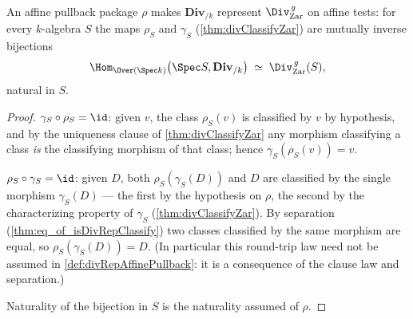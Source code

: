 \begin{theorem}
  \label{thm:divRepAffinePullback_equiv}
  \leanok
  An affine pullback package \(\rho\) makes \(\mathbf{Div}_{/k}\) represent
  \(\Div^{\,g}_{\mathrm{Zar}}\) on affine tests: for every \(k\)-algebra \(S\) the maps
  \(\rho_S\) and \(\gamma_S\) (\ref{thm:divClassifyZar}) are mutually inverse bijections
  \[
    \Hom_{\Over(\Spec k)}\bigl(\Spec S, \mathbf{Div}_{/k}\bigr)
      \;\simeq\; \Div^{\,g}_{\mathrm{Zar}}(S),
  \]
  natural in \(S\).
\end{theorem}
\begin{proof}
  \leanok
  \(\gamma_S \circ \rho_S = \id\): given \(v\), the class \(\rho_S(v)\) is classified by
  \(v\) by hypothesis, and by the uniqueness clause of \ref{thm:divClassifyZar} any
  morphism classifying a class \emph{is} the classifying morphism of that class; hence
  \(\gamma_S(\rho_S(v)) = v\).

  \(\rho_S \circ \gamma_S = \id\): given \(D\), both \(\rho_S(\gamma_S(D))\) and \(D\) are
  classified by the single morphism \(\gamma_S(D)\) --- the first by the hypothesis on
  \(\rho\), the second by the characterizing property of \(\gamma_S\)
  (\ref{thm:divClassifyZar}). By separation (\ref{thm:eq_of_isDivRepClassify}) two classes
  classified by the same morphism are equal, so \(\rho_S(\gamma_S(D)) = D\). (In particular
  this round-trip law need not be assumed in \ref{def:divRepAffinePullback}: it is a
  consequence of the clause law and separation.)

  Naturality of the bijection in \(S\) is the naturality assumed of \(\rho\).
\end{proof}

